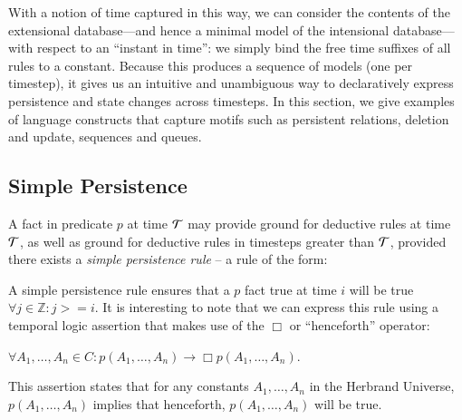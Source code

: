 With a notion of time captured in this way, we can consider the contents of the extensional database---and hence a minimal model of the intensional database---with respect to an ``instant in time'': we simply bind the free time suffixes of all rules to a constant.  Because this produces a sequence of models (one per timestep), it gives us an intuitive and unambiguous way to declaratively express persistence and state changes across timesteps.  In this section, we 
give examples of language constructs that capture motifs such as persistent relations, deletion and update, sequences
and queues.

\subsection{Simple Persistence}

A fact in predicate $p$ at time $\Tau$ may provide ground for deductive rules
at time $\Tau$, as well as ground for deductive rules in timesteps greater than $\Tau$,
provided there exists a {\em simple persistence rule} -- a rule of the form:



A simple persistence rule ensures that a $p$ fact true at time $i$ will be true
$\forall j \in \mathbb{Z} : j >= i$.  It is interesting to note that we can
express this rule using a temporal logic assertion that makes use of the $\Box$
or ``henceforth'' operator:

$\forall A_1, \ldots, A_n \in C : p$\pos$(A_1, \ldots, A_n) \to \Box p$\pos$(A_1,
\ldots, A_n)$.

This assertion states that for any constants $A_1, \ldots, A_n$ in the Herbrand
Universe, $p$\pos$(A_1, \ldots, A_n)$ implies that henceforth, \linebreak
$p$\pos$(A_1, \ldots, A_n)$ will be true.

